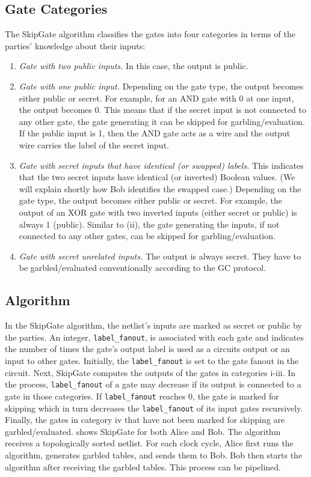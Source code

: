 \subsection{Gate Categories}\label{ssect:skipgate_example}
The SkipGate algorithm classifies the gates into four categories in terms of the parties' knowledge about their inputs:

\begin{enumerate}[label=\roman*]
  \item \textit{Gate with two public inputs.} In this case, the output is public.
  \item \textit{Gate with one public input.}
  	Depending on the gate type, the output becomes either public or secret.
  	For example, for an AND gate with 0 at one input, the output becomes 0.
  	This means that if the secret input is not connected to any other gate, the gate generating it can be skipped for garbling/evaluation.
  	If the public input is 1, then the AND gate acts as a wire and the output wire carries the label of the secret input.
  \item \textit{Gate with secret inputs that have identical (or swapped) labels.}
    This indicates that the two secret inputs have identical (or inverted) Boolean values.
    (We will explain shortly how Bob identifies the swapped case.)
    Depending on the gate type, the output becomes either public or secret.
    For example, the output of an XOR gate with two inverted inputs (either secret or public) is always 1 (public).
  	Similar to (ii), the gate generating the inputs, if not connected to any other gates, can be skipped for garbling/evaluation.
  \item \textit{Gate with secret unrelated inputs.}
  	The output is always secret.
  	They have to be garbled/evaluated conventionally according to the GC protocol.
\end{enumerate}

\subsection{Algorithm}\label{ssect:skipgate_algorithm}
In the SkipGate algorithm, the netlist's inputs are marked as secret or public by the parties.
An integer, \texttt{label\_fanout}, is associated with each gate and indicates the number of times the gate's output label is used as a circuits output or an input to other gates.
Initially, the \texttt{label\_fanout} is set to the gate fanout in the circuit.
Next, SkipGate computes the outputs of the gates in categories i-iii.
In the process, \texttt{label\_fanout} of a gate may decrease if its output is connected to a gate in those categories.
If \texttt{label\_fanout} reaches 0, the gate is marked for skipping which in turn decreases the \texttt{label\_fanout} of its input gates recursively.
Finally, the gates in category iv that have not been marked for skipping are garbled/evaluated.
 shows SkipGate for both Alice and Bob.
The algorithm receives a topologically sorted netlist.
For each clock cycle, Alice first runs the algorithm, generates garbled tables, and sends them to Bob.
Bob then starts the algorithm after receiving the garbled tables.
This process can be pipelined.

